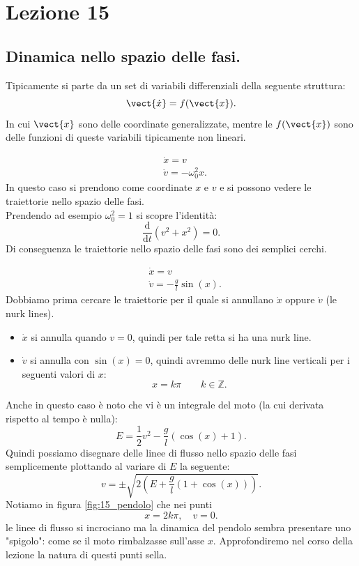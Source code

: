 \section{Lezione 15}%
\label{sub:Lezione 15}
\subsection{Dinamica nello spazio delle fasi.}%
\label{sub:Dinamica nello spazio delle fasi.}
Tipicamente si parte da un set di variabili differenziali della seguente struttura:
\[
    \vect{\dot{x}} = f(\vect{x}) 
.\] 
In cui $\vect{x}$  sono delle coordinate generalizzate, mentre le $f(\vect{x})$  sono delle funzioni di queste variabili tipicamente non lineari.
\begin{exmp}
    \[\begin{aligned}
	& \dot{x}=v\\
	& \dot{v} = -\omega_0^2x
    .\end{aligned}\]
    In questo caso si prendono come coordinate $x$  e $v$  e si possono vedere le traiettorie nello spazio delle fasi.\\
    Prendendo ad esempio $\omega_0^2 = 1$  si scopre l'identità:
    \[
	\frac{\text{d} }{\text{d} t} (v^2+x^2) = 0
    .\] 
    Di conseguenza le traiettorie nello spazio delle fasi sono dei semplici cerchi.
\end{exmp}
\noindent
\begin{exmp}[Pendolo]
    \[\begin{aligned}
	& \dot{x}=v\\
	& \dot{v}=-\frac{g}{l}\sin (x) 
    .\end{aligned}\]
    Dobbiamo prima cercare le traiettorie per il quale si annullano $\dot{x}$ oppure $\dot{v}$ (le nurk lines). 
    \begin{itemize}
        \item $\dot{x}$ si annulla quando $v = 0$, quindi per tale retta si ha una nurk line.
	\item $\dot{v}$ si annulla con $\sin (x) = 0$, quindi avremmo delle nurk line verticali per i seguenti valori di $x$: 
	    \[
		x = k\pi  \qquad k \in \mathbb{Z}
	    .\] 
    \end{itemize}
    Anche in questo caso è noto che vi è un integrale del moto (la cui derivata rispetto al tempo è nulla): 
    \[
	E = \frac{1}{2}v^2 - \frac{g}{l}\left(\cos (x) + 1\right)
    .\] 
    Quindi possiamo disegnare delle linee di flusso nello spazio delle fasi semplicemente plottando al variare di $E$  la seguente:
    \[
	v = \pm \sqrt{2 \left( E + \frac{g}{l}(1 + \cos (x)) \right) } 
    .\] 
    Notiamo in figura \ref{fig:15_pendolo} che nei punti 
    \[
        x = 2k\pi, \quad v = 0
    .\] 
    le linee di flusso si incrociano ma la dinamica del pendolo sembra presentare uno "spigolo": come se il moto rimbalzasse sull'asse $x$. Approfondiremo nel corso della lezione la natura di questi punti sella.
\end{exmp}
